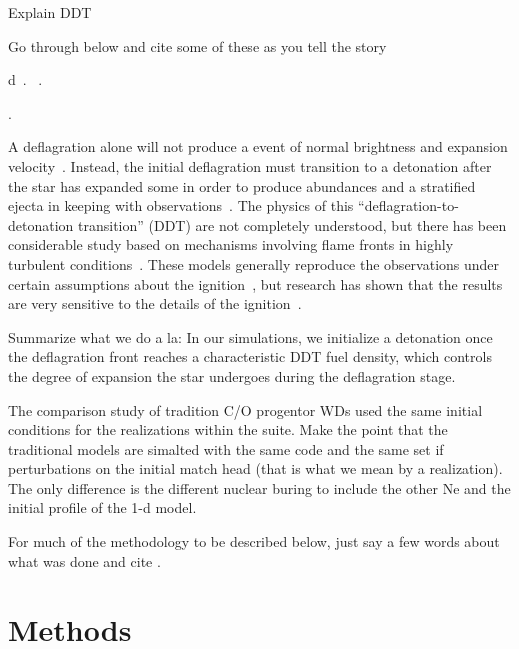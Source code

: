 \documentclass[iop,apj]{emulateapj}
\begin{document}
Explain DDT

Go through below and cite some of these as you tell the story

d~\citep{arnett.truran.ea:nucleosynthesis}.
~\citep{mazzalietal2008}.  


\citep{khokhlov1993,bychovliberman1995,
SNrt,Khok95,NiemHill95,khoketal1997,ZingDurs07,
cholazarianvishniac2003,
roepkehn2003,roepkehn2004,
Zingale2005Three-dimension,Schmetal06a, Schmetal06b,Aspdetal08,
Woosetal09,csetal2009,hicksrosner2013,c-ssr2013,
jacketal2014,poludnenko2015,hicks2015}.


A deflagration alone will not produce a event of normal brightness and
expansion velocity~\citep{roepkeetal07}. Instead, the initial
deflagration must transition to a detonation after the star has
expanded some in order to produce abundances and a stratified ejecta
in keeping with
observations~\citep{Khokhlov1991Delayed-detonat,hokowh95}.
The physics of this ``deflagration-to-detonation transition'' (DDT)
are not completely understood, but there has been considerable study
based on mechanisms involving flame fronts in highly turbulent
conditions~\citep{1986SvAL, woosley90, Khokhlov1991Delayed-detonat,
  hokowh95, HoefKhok96, khoketal1997, NiemWoos97, hwt98, Niem99,
  GameKhokOran05,roepke07, poletal2011,c-ssr2013,poludnenko2015}.
These models generally reproduce the observations under certain
assumptions about the ignition~\citep{townetal2009}, but research has
shown that the results are very sensitive to the details of the
ignition~\citep{PlewCaldLamb04,GameKhokOran05,garciasenz:2005,
  roepkeetal07,Jordan2008Three-Dimension}.

Summarize what we do a la:
In our simulations, we initialize a detonation once the 
deflagration front reaches a
characteristic DDT fuel density, which controls the degree of
expansion the star undergoes during the deflagration stage.

The comparison study of tradition C/O progentor WDs used the same
initial conditions for the realizations within the suite. Make the
point that the traditional models are simalted with the same code
and the same set if perturbations on the initial match head (that is
what we mean by a realization). The only difference is the different
nuclear buring to include the other Ne and the initial profile of
the 1-d model.  

For much of the methodology to be described below, just say a few
words about what was done and cite \citet{willcoxetal2016}.

\section{Methods}
\end{document}
